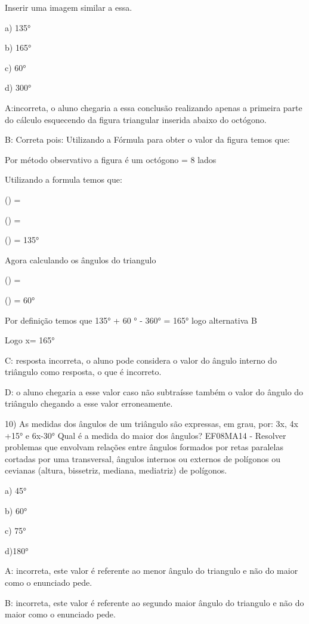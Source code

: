 Inserir uma imagem similar a essa.

a) 135°

b) 165°

c) 60°

d) 300°

A:incorreta, o aluno chegaria a essa conclusão realizando apenas a
primeira parte do cálculo esquecendo da figura triangular inserida
abaixo do octógono.

B: Correta pois: Utilizando a Fórmula para obter o valor da figura temos
que:

Por método observativo a figura é um octógono = 8 lados

Utilizando a formula temos que:

() =

() =

() = 135°

Agora calculando os ângulos do triangulo

() =

() = 60°

Por definição temos que 135° + 60 ° - 360° = 165° logo alternativa B

Logo x= 165°

C: resposta incorreta, o aluno pode considera o valor do ângulo interno
do triângulo como resposta, o que é incorreto.

D: o aluno chegaria a esse valor caso não subtraísse também o valor do
ângulo do triângulo chegando a esse valor erroneamente.

10) As medidas dos ângulos de um triângulo são expressas, em grau, por:
3x, 4x +15° e 6x-30° Qual é a medida do maior dos ângulos? EF08MA14 -
Resolver problemas que envolvam relações entre ângulos formados por
retas paralelas cortadas por uma transversal, ângulos internos ou
externos de polígonos ou cevianas (altura, bissetriz, mediana,
mediatriz) de polígonos.

a) 45°

b) 60°

c) 75°

d)180°

A: incorreta, este valor é referente ao menor ângulo do triangulo e não
do maior como o enunciado pede.

B: incorreta, este valor é referente ao segundo maior ângulo do
triangulo e não do maior como o enunciado pede.

